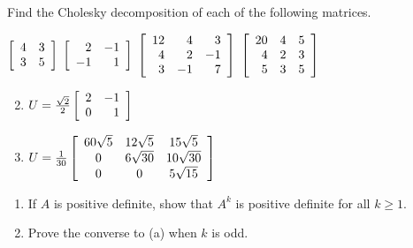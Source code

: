 \begin{multicols}{2}
\begin{ex}
Find the Cholesky decomposition of each of the following matrices.


\begin{exenumerate}
\exitem $\left[ \begin{array}{rr}
4 & 3 \\
3 & 5
\end{array}\right]$
\exitem $\left[ \begin{array}{rr}
2 & -1 \\
-1 & 1
\end{array}\right]$
\exitem$\left[ \begin{array}{rrr}
12 & 4 & 3 \\
4 & 2 & -1 \\
3 & -1 & 7 
\end{array}\right]$
\exitem $\left[ \begin{array}{rrr}
20 & 4 & 5 \\
4 & 2 & 3 \\
5 & 3 & 5 
\end{array}\right]$
\end{exenumerate}
\begin{sol}
\begin{enumerate}[label={\alph*.}]
\setcounter{enumi}{1}
\item  $U = \tfrac{\sqrt{2}}{2} \left[ \begin{array}{rr}
2 & -1 \\
0 & 1 
\end{array}\right]$

\setcounter{enumi}{3}
\item  
$U = \tfrac{1}{30} \left[ \begin{array}{ccc}
60\sqrt{5} & 12\sqrt{5} & 15\sqrt{5} \\
0 & 6\sqrt{30} & 10\sqrt{30} \\
0 & 0 & 5\sqrt{15}
\end{array}\right]$


\end{enumerate}
\end{sol}
\end{ex}

\begin{ex}
\begin{enumerate}[label={\alph*.}]
\item If $A$ is positive definite, show that $A^{k}$ is positive definite for all $k \geq 1$.

\item Prove the converse to (a) when $k$ is odd.


\end{enumerate}
\end{ex}
\end{multicols}

